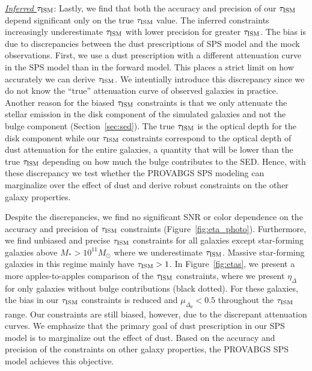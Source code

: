 \noindent \underline{\emph{Inferred $\tau_{\rm ISM}$}}:  
Lastly, we find that both the accuracy and precision of our $\tau_{\rm ISM}$ depend
significant only on the true $\tau_{\rm ISM}$ value. 
The inferred constraints increasingly underestimate $\tau_{\rm ISM}$ with lower
precision for greater $\tau_{\rm ISM}$.
The bias is due to discrepancies between the dust prescriptions of SPS model
and the mock observations. 
First, we use a dust prescription with a different attenuation curve in the SPS
model than in the forward model. 
This places a strict limit on how accurately we can derive $\tau_{\rm ISM}$.
We intentially introduce this discrepancy since we do not know the ``true''
attenuation curve of observed galaxies in practice. 
Another reason for the biased $\tau_{\rm ISM}$ constraints is that we only attenuate
the stellar emission in the disk component of the simulated galaxies and not
the bulge component (Section~\ref{sec:sed}).
The true $\tau_{\rm ISM}$ is the optical depth for the disk component while our
$\tau_{\rm ISM}$ constraints correspond to the optical depth of dust attenuation
for the entire galaxies, a quantity that will be lower than the true $\tau_{\rm ISM}$
depending on how much the bulge contributes to the SED. 
Hence, with these discrepancy we test whether the {\sc PROVABGS} SPS modeling
can marginalize over the effect of dust and derive robust constraints on the
other galaxy properties.

Despite the discrepancies, we find no significant SNR or color dependence on
the accuracy and precision of $\tau_{\rm ISM}$ constraints
(Figure~\ref{fig:eta_photo}). 
Furthermore, we find unbiased and precise $\tau_{\rm ISM}$ constraints for all galaxies
except star-forming galaxies above $M_* > 10^{11}M_\odot$ where we underestimate 
$\tau_{\rm ISM}$. 
Massive star-forming galaxies in this regime mainly have $\tau_{\rm ISM} > 1$.
In Figure~\ref{fig:etas}, we present a more apples-to-apples comparison of the
$\tau_{\rm ISM}$ constraints, where we present $\eta_\Delta$ for only galaxies without
bulge contributions (black dotted). 
For these galaxies, the bias in our $\tau_{\rm ISM}$ constraints is reduced and
$\mu_{\Delta_\theta}<0.5$ throughout the $\tau_{\rm ISM}$ range. 
Our constraints are still biased, however, due to the discrepant attenuation
curves. 
We emphasize that the primary goal of dust prescription in our SPS model is to
marginalize out the effect of dust. 
Based on the accuracy and precision of the constraints on other galaxy
properties, the {\sc PROVABGS} SPS model achieves this objective.  
